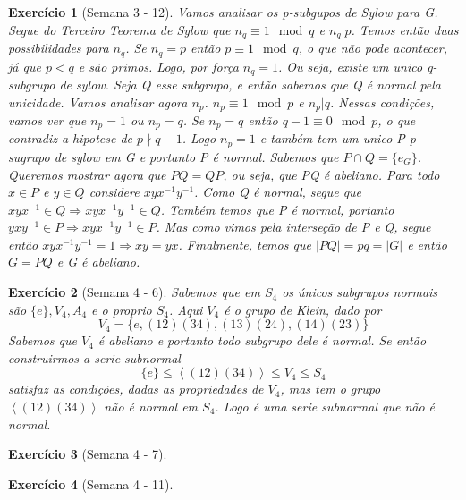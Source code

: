 \documentclass{article}
\newtheorem*{ex}{Exercício}
\begin{document}
\begin{ex}[Semana 3 - 12]
    Vamos analisar os p-subgupos de Sylow para G.
    Segue do Terceiro Teorema de Sylow que $n_q \equiv 1 \mod q$ e $n_q \vert p$.
    Temos então duas possibilidades para $n_q$.
    Se $n_q = p$ então $p \equiv 1 \mod q$, o que não pode acontecer, já que $p < q$ e são primos.
    Logo, por força $n_q = 1$. Ou seja, existe um unico q-subgrupo de sylow. 
    Seja Q esse subgrupo, e então sabemos que Q é normal pela unicidade.
    Vamos analisar agora $n_p$. 
    $n_p \equiv 1 \mod p$ e $n_p \vert q$.
    Nessas condições, vamos ver que $n_p = 1$ ou $n_p = q$.
    Se $n_p = q$ então $q - 1 \equiv 0 \mod p$, o que contradiz a hipotese de $p \nmid q-1$.
    Logo $n_p =1 $ e também tem um unico P p-sugrupo de sylow em G e portanto P é normal.
    Sabemos que $P \cap Q = \{e_G\}$.
    Queremos mostrar agora que $PQ = QP$, ou seja, que PQ é abeliano.
    Para todo $x \in P$ e $y \in Q$ considere $xyx^{-1}y^{-1}$.
    Como Q é normal, segue que $xyx^{-1} \in Q \Rightarrow xyx^{-1}y^{-1} \in Q$.
    Também temos que P é normal, portanto $yxy^{-1} \in P \Rightarrow xyx^{-1}y^{-1} \in P$.
    Mas como vimos pela interseção de P e Q, segue então $xyx^{-1}y^{-1} = 1 \Rightarrow xy = yx$.
    Finalmente, temos que $|PQ| = pq = |G|$ e então $G = PQ$ e G é abeliano.
\end{ex}

\begin{ex}[Semana 4 - 6]
    Sabemos que em $S_4$ os únicos subgrupos normais são $\{e\}, V_4, A_4$ e o proprio $S_4$.
    Aqui $V_4$ é o grupo de Klein, dado por
    \[V_4 = \{ e, (12)(34), (13)(24), (14)(23) \}\]
    Sabemos que $V_4$ é abeliano e portanto todo subgrupo dele é normal. 
    Se então construirmos a serie subnormal 
    \[\{e\} \leq \left\langle (12)(34)\right\rangle \leq V_4 \leq S_4 \]
    satisfaz as condições, dadas as propriedades de $V_4$, mas tem o grupo $\left\langle (12)(34)\right\rangle$ não é normal em $S_4$.
    Logo é uma serie subnormal que não é normal.
\end{ex}

\begin{ex}[Semana 4 - 7]
    
\end{ex}

\begin{ex}[Semana 4 - 11]
    
\end{ex}
\end{document}

